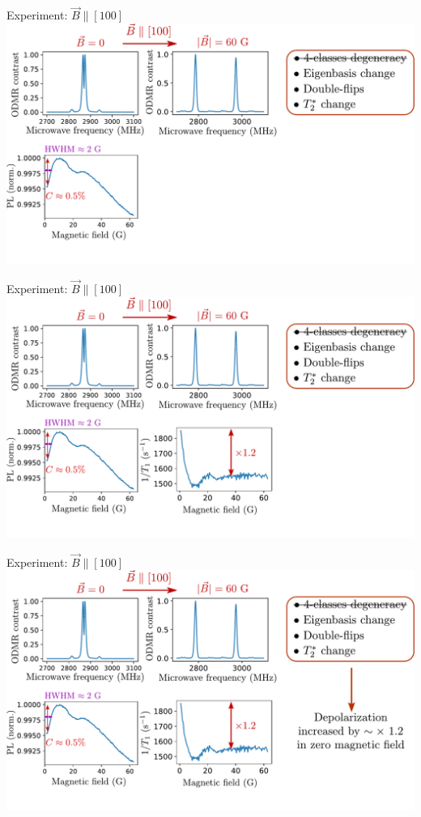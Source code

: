 \documentclass{beamer}
\begin{document}
\begin{frame}{Experiment: $\vec B \parallel [100]$}
\centering
\includegraphics[width=\textwidth,height=0.85\textheight,keepaspectratio]{Slide_T1_PL_100_f-3}
\end{frame}

\begin{frame}{Experiment: $\vec B \parallel [100]$}
\centering
\includegraphics[width=\textwidth,height=0.85\textheight,keepaspectratio]{Slide_T1_PL_100_f-2}
\end{frame}

\begin{frame}{Experiment: $\vec B \parallel [100]$}
\centering
\includegraphics[width=\textwidth,height=0.85\textheight,keepaspectratio]{Slide_T1_PL_100_f-1}
\end{frame}
\end{document}
